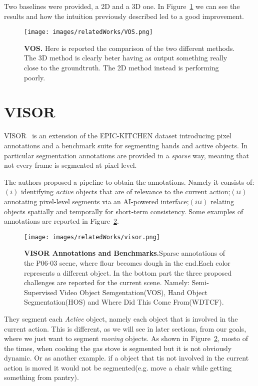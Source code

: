 Two baselines were provided, a 2D and a 3D one. In Figure~\ref{fig:VOS} we can see the results and how the intuition previously described led to a good improvement.
\begin{figure}
    \centering
    \texttt{[image: images/relatedWorks/VOS.png]} 
    \caption{\textbf{VOS.} Here is reported the comparison of the two different methods.
    The 3D method is clearly beter having as output something really close to the groundtruth. The 2D method instead is performing poorly.}\label{fig:VOS}
\end{figure}

\section{VISOR}


VISOR~\cite{visor} is an extension of the EPIC-KITCHEN dataset introducing pixel annotations and a benchmark
suite for segmenting hands and active objects. In particular segmentation annotations are provided in a \textit{sparse} way, meaning
that not every frame is segmented at pixel level.

The authors proposed a pipeline to obtain the annotations. Namely it consists of: $(i)$ identifying \textit{active} objects that are of relevance
to the current action;$(ii)$annotating pixel-level segments via an AI-powered interface;$(iii)$ relating objects spatially and temporally for short-term consistency.
Some examples of annotations are reported in Figure~\ref{fig:visor}.

\begin{figure}
    \centering
    \texttt{[image: images/relatedWorks/visor.png]} 
    \caption{\textbf{VISOR Annotations and Benchmarks.}Sparse annotations of the P06-03 scene, where flour becomes dough in the end.Each color represents a different object.
    In the bottom part the three proposed challenges are reported for the current scene. Namely: Semi-Supervised Video Object Semgentation(VOS),
     Hand Object Segmentation(HOS) and Where Did This Come From(WDTCF).}\label{fig:visor}
\end{figure}

They segment each \textit{Active} object, namely each object that is involved in the current action. This is different, as we will see in later sections,
from our goals, where we just want to segment \textit{moving} objects. As shown in Figure~\ref{fig:visor}, mosto of the times, when cooking the gas stove is segmented
but it is not obviously dynamic. Or as another example. if a  object that tis not involved in the current action is moved it would not be segmented(e.g. move a chair 
while getting something from pantry).

